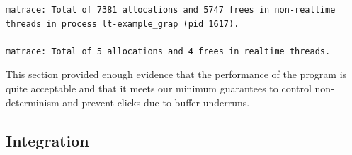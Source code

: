 \begin{mynote}
\label{note:matrace-output}\footnotesize
\begin{verbatim}
matrace: Total of 7381 allocations and 5747 frees in non-realtime 
threads in process lt-example_grap (pid 1617).

matrace: Total of 5 allocations and 4 frees in realtime threads.
\end{verbatim}
\end{mynote}

This section provided enough evidence that the performance of the
program is quite acceptable and that it meets our minimum guarantees
to control non-determinism and prevent clicks due to buffer underruns.

\subsection{Integration}
\label{sec:graph-integration}

